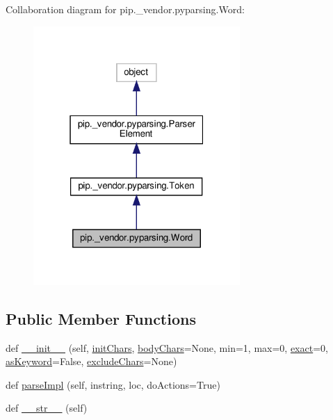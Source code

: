 Collaboration diagram for pip.\+\_\+vendor.\+pyparsing.\+Word\+:
\nopagebreak
\begin{figure}[H]
\begin{center}
\leavevmode
\includegraphics[width=223pt]{classpip_1_1__vendor_1_1pyparsing_1_1Word__coll__graph}
\end{center}
\end{figure}
\subsection*{Public Member Functions}
\begin{DoxyCompactItemize}
\item 
def \hyperlink{classpip_1_1__vendor_1_1pyparsing_1_1Word_a332703c270926d8c390dcfa51031876a}{\+\_\+\+\_\+init\+\_\+\+\_\+} (self, \hyperlink{classpip_1_1__vendor_1_1pyparsing_1_1Word_af0533d25a0473bf06e194ff40946187a}{init\+Chars}, \hyperlink{classpip_1_1__vendor_1_1pyparsing_1_1Word_af76643db9297b176316e4f4e8b34a553}{body\+Chars}=None, min=1, max=0, \hyperlink{namespacepip_1_1__vendor_1_1pyparsing_a42c1593fb4acbba6a25348303fae2aa1}{exact}=0, \hyperlink{classpip_1_1__vendor_1_1pyparsing_1_1Word_a417fbb59497f780426040fb713ae08dc}{as\+Keyword}=False, \hyperlink{namespacepip_1_1__vendor_1_1pyparsing_a0d91a975c3e4cd362b4cf0f821369244}{exclude\+Chars}=None)
\item 
def \hyperlink{classpip_1_1__vendor_1_1pyparsing_1_1Word_a800fb3b5683a4a6c4cfb7fee0f2f095c}{parse\+Impl} (self, instring, loc, do\+Actions=True)
\item 
def \hyperlink{classpip_1_1__vendor_1_1pyparsing_1_1Word_abef907ce0a4a95d05dd7a0e3ae6ec869}{\+\_\+\+\_\+str\+\_\+\+\_\+} (self)
\end{DoxyCompactItemize}
